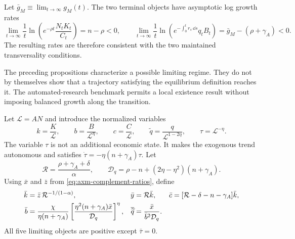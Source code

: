 \begin{proposition}
Let
\(\bar g_M\equiv\lim_{t\to\infty}g_M(t)\). The two
terminal objects have asymptotic log growth rates
\begin{equation}
 \lim_{t\to\infty}\frac{1}{t}\ln\left(
 e^{-\rho t}\frac{N_tK_t}{C_t}\right)=n-\rho<0,
 \qquad
 \lim_{t\to\infty}\frac{1}{t}\ln\left(
 e^{-\int_0^t r_s\,\dd s}q_tB_t\right)
 =\bar g_M-(\rho+\gamma_A)<0.
 \label{eq:axm-complement-tvc-rates}
\end{equation}
The resulting rates are therefore consistent with the two maintained
transversality conditions.
\end{proposition}

The preceding propositions characterize a possible limiting regime. They do
not by themselves show that a trajectory satisfying the equilibrium definition
reaches it. The automated-research benchmark permits a local existence result
without imposing balanced growth along the transition.

Let \(\mathcal L=AN\) and introduce the normalized variables
\begin{equation}
 k=\frac{K}{\mathcal L},\qquad
 b=\frac{B}{\mathcal L^\eta},\qquad
 c=\frac{C}{\mathcal L},\qquad
 \widetilde q=\frac{q}{\mathcal L^{1-2\eta}},\qquad
 \tau=\mathcal L^{-\eta}.
 \label{eq:axm-complement-stationary-variables}
\end{equation}
The variable \(\tau\) is not an additional economic state. It makes the
exogenous trend autonomous and satisfies
\(\dot\tau=-\eta(n+\gamma_A)\tau\). Let
\begin{equation}
 \mathcal R=\frac{\rho+\gamma_A+\delta}{\alpha},\qquad
 \mathcal D_q=\rho-n+(2\eta-\eta^2)(n+\gamma_A).
 \label{eq:axm-complement-local-definitions}
\end{equation}
Using \(\bar x\) and \(\bar z\) from
\eqref{eq:axm-complement-ratios}, define
\begin{align}
 \bar k&=\bar z\,\mathcal R^{-1/(1-\alpha)},
 &\bar y&=\mathcal R\bar k,
 &\bar c&=[\mathcal R-\delta-n-\gamma_A]\bar k,\notag\\
 \bar b&=\frac{\chi}{\eta(n+\gamma_A)}
 \left[
  \frac{\eta^2(n+\gamma_A)\bar x}{\mathcal D_q}
 \right]^\eta,
 &\overline{\widetilde q}
 &=\frac{\bar x}{\bar b^2\mathcal D_q}.
 \label{eq:axm-complement-local-fixed-point}
\end{align}
All five limiting objects are positive except \(\bar\tau=0\).

